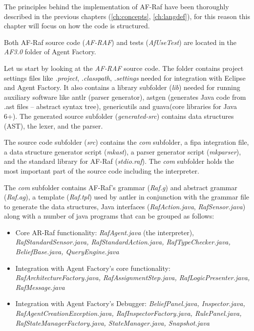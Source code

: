 \documentclass[a4paper,12pt,oneside,fleqn]{book} %
\begin{document}
The principles behind the implementation of AF-Raf have been thoroughly
described in the previous chapters (\autoref{ch:concepts},
\autoref{ch:langdef}), for this reason this chapter will focus on how the
code is structured.

Both AF-Raf source code (\textit{AF-RAF}) and tests (\textit{AfUseTest})
are located in the \textit{AF3.0} folder of Agent Factory. 

Let us start by looking at the \textit{AF-RAF} source code. The folder
contains project settings files like \textit{.project},
\textit{.classpath}, \textit{.settings} needed for integration with Eclipse
and Agent Factory. It also contains a library subfolder (\textit{lib})
needed for running auxiliary software like antlr (parser generator), astgen
(generates Java code from .ast files -- abstract syntax tree), genericutils
and guava(core libraries for Java 6+). The generated source subfolder
(\textit{generated-src}) contains data structures (AST), the lexer, and the
parser. 

The source code subfolder (\textit{src}) contains the \textit{com}
subfolder, a fipa integration file, a data structure generator script
(\textit{mkast}), a parser generator script (\textit{mkparser}), and the
standard library for AF-Raf (\textit{stdio.raf}). The \textit{com}
subfolder holds the most important part of the source code including the
interpreter.

The \textit{com} subfolder contains AF-Raf's grammar (\textit{Raf.g}) and
abstract grammar (\textit{Raf.ag}), a template (\textit{Raf.tpl}) used by
antler in conjunction with the grammar file to generate the data
structures, Java interfaces (\textit{RafAction.java},
\textit{RafSensor.java}) along with a number of java programs that can be
grouped as follows: 

\begin{itemize}
  \item Core AR-Raf functionality: \textit{RafAgent.java} (the interpreter),
    \textit{RafStandardSensor.java, RafStandardAction.java, RafTypeChecker.java, BeliefBase.java, QueryEngine.java}
    \item Integration with Agent Factory's core
      functionality:
      \textit{RafArchitectureFactory.java, RafAssignmentStep.java,
      RafLogicPresenter.java, RafMessage.java }
    \item Integration with Agent Factory's Debugger: \textit{BeliefPanel.java,
      Inspector.java, RafAgentCreationException.java,
    RafInspectorFactory.java, RulePanel.java,
  RafStateManagerFactory.java, StateManager.java, Snapshot.java}
\end{itemize}
\end{document}
